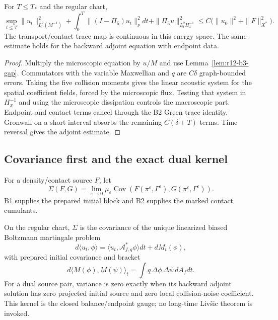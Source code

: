 \begin{theorem}
\label{thm:r12-b3-energy}
For $T\le T_*$ and the regular chart,
\[
 \sup_{t\le T}\|u_t\|_{L^2(M^{-1})}^2
 +\int_0^T\|(I-\Pi_5)u_t\|_\nu^2dt
 +\|\Pi_5u\|_{L^2_tH^{-1}_x}^2
 \le C\bigl(\|u_0\|^2+\|F\|_{X^*}^2\bigr).
\]
The transport/contact trace map is continuous in this energy space.  The same
estimate holds for the backward adjoint equation with endpoint data.
\end{theorem}

\begin{proof}
Multiply the microscopic equation by $u/M$ and use
Lemma~\ref{lem:r12-b3-gap}.  Commutators with the variable Maxwellian and $q$
are $C\delta$ graph-bounded errors.  Taking the five collision moments gives
the linear acoustic system for the spatial coefficient fields, forced by the
microscopic flux.  Testing that system in $H^{-1}_x$ and using the microscopic
dissipation controls the macroscopic part.  Endpoint and contact terms cancel
through the B2 Green trace identity.  Gronwall on a short interval absorbs the
remaining $C(\delta+T)$ terms.  Time reversal gives the adjoint estimate.
\end{proof}

\subsection{Covariance first and the exact dual kernel}

For a density/contact source $F$, let
\[
 \Sigma(F,G)=\lim_{\varepsilon\to0}
 \mu_\varepsilon\operatorname{Cov}(F(\pi^\varepsilon,\Gamma^\varepsilon),
                                    G(\pi^\varepsilon,\Gamma^\varepsilon)).
\]
B1 supplies the prepared initial block and B2 supplies the marked contact
cumulants.

\begin{theorem}
\label{thm:r12-b3-noise}
On the regular chart, $\Sigma$ is the covariance of the unique linearized
biased Boltzmann martingale problem
\[
 d\langle u_t,\phi\rangle
 =\langle u_t,\mathcal A_{f,q}^*\phi\rangle dt+dM_t(\phi),
\]
with prepared initial covariance and bracket
\[
 d\langle M(\phi),M(\psi)\rangle_t
 =\int q\,\Delta\phi\,\Delta\psi\,dA_fdt.
\]
For a dual source pair, variance is zero exactly when its backward adjoint
solution has zero projected initial source and zero local collision-noise
coefficient.  This kernel is the closed balance/endpoint gauge; no long-time
Liv\v{s}ic theorem is invoked.
\end{theorem}


